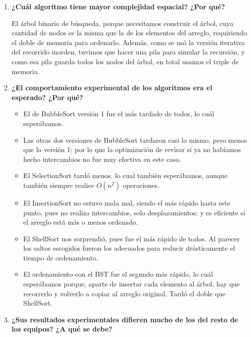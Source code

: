 \documentclass[12pt, fleqn]{report}                             %
\theoremstyle{break}                                            %
\begin{document}
\begin{enumerate}
	            \item \textbf{¿Cuál algoritmo tiene mayor complejidad espacial? ¿Por qué?}
	            
	                El árbol binario de búsqueda, porque necesitamos construir el árbol, cuya cantidad de nodos es la misma que la de los elementos del arreglo, requiriendo el doble de memoria para ordenarlo. Además, como se usó la versión iterativa del recorrido inorden, tuvimos que hacer una pila para simular la recursión, y como esa pila guarda todos los nodos del árbol, en total usamos el triple de memoria.
	            
	            \item \textbf{¿El comportamiento experimental de los algoritmos era el esperado? ¿Por qué?}
	            
	                \begin{itemize}\setlength\itemsep{0em}
	                    \item El de BubbleSort versión 1 fue el más tardado de todos, lo cuál esperábamos.
	                    \item Las otras dos versiones de BubbleSort tardaron casi lo mismo, pero menos que la versión 1; por lo que la optimización de revisar si ya no habíamos hecho intercambios no fue muy efectiva en este caso.
	                    \item El SelectionSort tardó menos, lo cual también esperábamos, aunque también siempre realice $O(n^2)$ operaciones.
	                    \item El InsertionSort no estuvo nada mal, siendo el más rápido hasta este punto, pues no realiza intercambios, solo desplazamientos; y es eficiente si el arreglo está más o menos ordenado.
	                    \item El ShellSort nos sorprendió, pues fue el más rápido de todos. Al parecer los saltos escogidos fueron los adecuados para reducir drásticamente el tiempo de ordenamiento.
	                    \item El ordenamiento con el BST fue el segundo más rápido, lo cuál esperábamos porque, aparte de insertar cada elemento al árbol, hay que recorrerlo y volverlo a copiar al arreglo original. Tardó el doble que ShellSort.
	                \end{itemize}
	            
	            \item \textbf{¿Sus resultados experimentales difieren mucho de los del resto de los equipos? ¿A qué se debe?}
	            

\end{enumerate}
\end{document}
